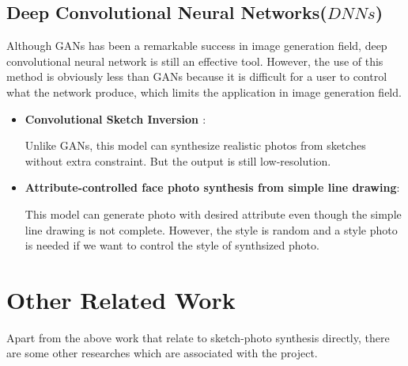 \documentclass{article}
\begin{document}
\subsection{Deep Convolutional Neural Networks($DNNs$)}
\indent Although GANs has been a remarkable success in image generation field, deep convolutional neural network is still an effective tool. However, the use of this method is obviously less than GANs because it is difficult for a user to control what the network produce, which limits the application in image generation field.



\begin{itemize}
\item \textbf{Convolutional Sketch Inversion \cite{G2016Convolutional}}: \par
Unlike GANs, this model can synthesize realistic photos from sketches without extra constraint. But the output is still low-resolution.

\item \textbf{Attribute-controlled face photo synthesis from simple line drawing\cite{Guo2017Attribute}}:\par
This model can generate photo with desired attribute even  though
the simple line drawing is not complete. However, the style is random and a style photo is needed if we want to control the style of synthsized photo.


\end{itemize}


\section{Other Related Work}
\indent Apart from the above work that relate to sketch-photo synthesis directly, there are some other researches which are associated with the project.
\end{document}
